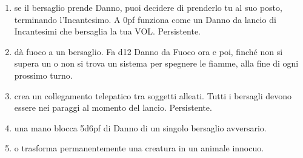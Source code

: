 \documentclass[itdr]{subfiles}
\begin{document}
\begin{enumerate}
	\item {} se il bersaglio prende Danno, puoi decidere di prenderlo tu al suo posto, terminando l'Incantesimo. A 0pf funziona come un Danno da lancio di Incantesimi che bersaglia la tua VOL. Persistente.
	\item {} dà fuoco a un bersaglio. Fa d12 Danno da Fuoco ora e poi, finché non si supera un  o non si trova un sistema per spegnere le fiamme, alla fine di ogni prossimo turno.
	\item {} crea un collegamento telepatico tra soggetti alleati. Tutti i bersagli devono essere nei paraggi al momento del lancio. \mbox{Persistente.}
	\item {} una mano blocca 5d6pf di Danno di un singolo bersaglio avversario.
	\item {}  o trasforma permanentemente una creatura in un animale innocuo.

\vfill
\break


\end{enumerate}
\end{document}
